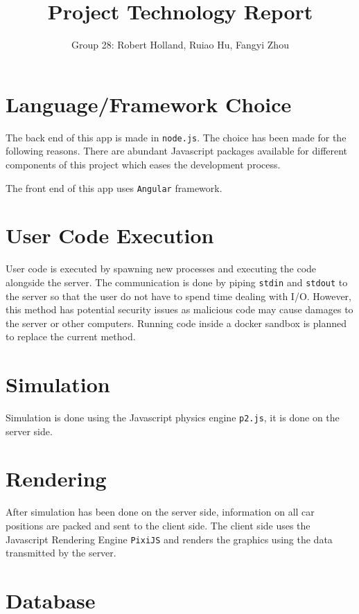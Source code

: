 \documentclass[a4paper]{article}
\title{Project Technology Report}
\author{Group 28: Robert Holland, Ruiao Hu, Fangyi Zhou}
\begin{document}
\maketitle

\section{Language/Framework Choice}

The back end of this app is made in \texttt{node.js}. The choice has been made
for the following reasons. There are abundant Javascript packages available for
different components of this project which eases the development process.

The front end of this app uses \texttt{Angular} framework.

\section{User Code Execution}

User code is executed by spawning new processes and executing the code
alongside the server. The communication is done by piping \texttt{stdin} and
\texttt{stdout} to the server so that the user do not have to spend time
dealing with I/O. However, this method has potential security issues as
malicious code may cause damages to the server or other computers. Running code
inside a docker sandbox is planned to replace the current method.

\section{Simulation}

Simulation is done using the Javascript physics engine \texttt{p2.js}, it is
done on the server side.

\section{Rendering}

After simulation has been done on the server side, information on all car
positions are packed and sent to the client side. The client side uses the
Javascript Rendering Engine \texttt{PixiJS} and renders the graphics using the
data transmitted by the server.

\section{Database}
\end{document}
